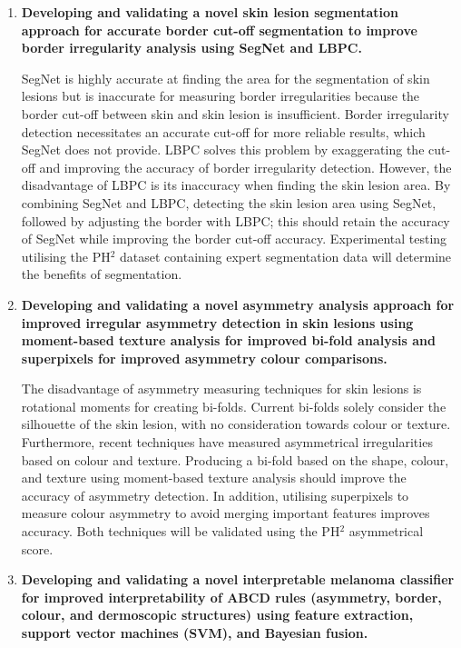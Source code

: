 \documentclass[10.5pt]{report}
\begin{document}
\begin{enumerate}

\item \textbf{Developing and validating a novel skin lesion segmentation approach for accurate border cut-off segmentation to improve border irregularity analysis using SegNet and LBPC.}

SegNet is highly accurate at finding the area for the segmentation of skin lesions but is inaccurate for measuring border irregularities because the border cut-off between skin and skin lesion is insufficient. Border irregularity detection necessitates an accurate cut-off for more reliable results, which SegNet does not provide. LBPC solves this problem by exaggerating the cut-off and improving the accuracy of border irregularity detection. However, the disadvantage of LBPC is its inaccuracy when finding the skin lesion area. By combining SegNet and LBPC, detecting the skin lesion area using SegNet, followed by adjusting the border with LBPC; this should retain the accuracy of SegNet while improving the border cut-off accuracy. Experimental testing utilising the PH$^2$ dataset containing expert segmentation data will determine the benefits of segmentation.

\item \textbf{Developing and validating a novel asymmetry analysis approach for improved irregular asymmetry detection in skin lesions using moment-based texture analysis for improved bi-fold analysis and superpixels for improved asymmetry colour comparisons.}

The disadvantage of asymmetry measuring techniques for skin lesions is rotational moments for creating bi-folds. Current bi-folds solely consider the silhouette of the skin lesion, with no consideration towards colour or texture. Furthermore, recent techniques have measured asymmetrical irregularities based on colour and texture. Producing a bi-fold based on the shape, colour, and texture using moment-based texture analysis should improve the accuracy of asymmetry detection. In addition, utilising superpixels to measure colour asymmetry to avoid merging important features improves accuracy. Both techniques will be validated using the PH$^2$ asymmetrical score.  

\item \textbf{Developing and validating a novel interpretable melanoma classifier for improved interpretability of ABCD rules (asymmetry, border, colour, and dermoscopic structures) using feature extraction, support vector machines (SVM), and Bayesian fusion.}


\end{enumerate}
\end{document}

